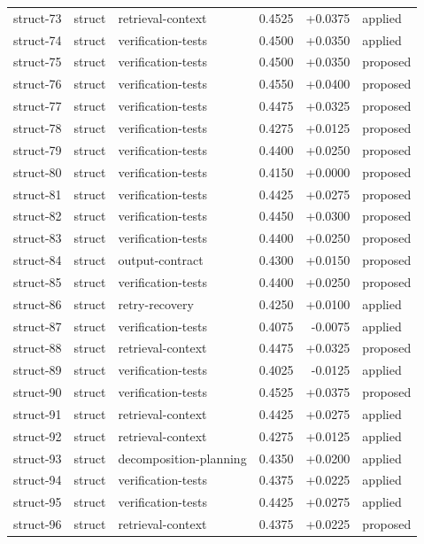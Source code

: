 \begin{center}
\begin{longtable}{llp{5.2cm}rrl}
struct-73 & struct & retrieval-context & 0.4525 & +0.0375 & applied \\
struct-74 & struct & verification-tests & 0.4500 & +0.0350 & applied \\
struct-75 & struct & verification-tests & 0.4500 & +0.0350 & proposed \\
struct-76 & struct & verification-tests & 0.4550 & +0.0400 & proposed \\
struct-77 & struct & verification-tests & 0.4475 & +0.0325 & proposed \\
struct-78 & struct & verification-tests & 0.4275 & +0.0125 & proposed \\
struct-79 & struct & verification-tests & 0.4400 & +0.0250 & proposed \\
struct-80 & struct & verification-tests & 0.4150 & +0.0000 & proposed \\
struct-81 & struct & verification-tests & 0.4425 & +0.0275 & proposed \\
struct-82 & struct & verification-tests & 0.4450 & +0.0300 & proposed \\
struct-83 & struct & verification-tests & 0.4400 & +0.0250 & proposed \\
struct-84 & struct & output-contract & 0.4300 & +0.0150 & proposed \\
struct-85 & struct & verification-tests & 0.4400 & +0.0250 & proposed \\
struct-86 & struct & retry-recovery & 0.4250 & +0.0100 & applied \\
struct-87 & struct & verification-tests & 0.4075 & -0.0075 & applied \\
struct-88 & struct & retrieval-context & 0.4475 & +0.0325 & proposed \\
struct-89 & struct & verification-tests & 0.4025 & -0.0125 & applied \\
struct-90 & struct & verification-tests & 0.4525 & +0.0375 & proposed \\
struct-91 & struct & retrieval-context & 0.4425 & +0.0275 & applied \\
struct-92 & struct & retrieval-context & 0.4275 & +0.0125 & applied \\
struct-93 & struct & decomposition-planning & 0.4350 & +0.0200 & applied \\
struct-94 & struct & verification-tests & 0.4375 & +0.0225 & applied \\
struct-95 & struct & verification-tests & 0.4425 & +0.0275 & applied \\
struct-96 & struct & retrieval-context & 0.4375 & +0.0225 & proposed \\

\end{longtable}
\end{center}
